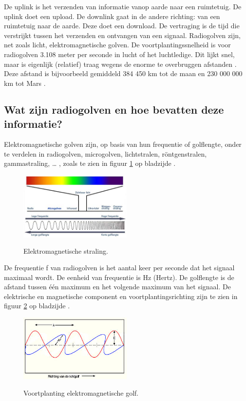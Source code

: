 De uplink is het verzenden van informatie vanop aarde naar een ruimtetuig. De uplink doet een upload. De downlink gaat in de andere richting: van een ruimtetuig naar de aarde. Deze doet een download. De vertraging is de tijd die verstrijkt tussen het verzenden en ontvangen van een signaal. Radiogolven zijn, net zoals licht, elektromagnetische golven. De voortplantingssnelheid is voor radiogolven 3.108 meter per seconde in lucht of het luchtledige. Dit lijkt snel, maar is eigenlijk (relatief) traag wegens de enorme te overbruggen afstanden \cite{updown}. Deze afstand is bijvoorbeeld gemiddeld 384 450 km tot de maan \cite{maan} en 230 000 000 km tot Mars \cite{mars}.

\subsection{Wat zijn radiogolven en hoe bevatten deze informatie?}

Elektromagnetische golven zijn, op basis van hun frequentie of golflengte, onder te verdelen in radiogolven, microgolven, lichtstralen, röntgenstralen, gammastraling, … \cite{radiowaves}, zoals te zien in figuur \ref{fig:EMS} op bladzijde \pageref{fig:EMS}.

\begin{figure}[ht]
  \centering
  \includegraphics[width=0.5\textwidth]{voorbeeld_figuren/spectrum_straling}
  \caption{Elektromagnetische straling.}
  \cite{energiezonnepanelen} %
  \label{fig:EMS}
\end{figure}

De frequentie f van radiogolven is het aantal keer per seconde dat het signaal maximaal wordt. De eenheid van frequentie is Hz (Hertz). De golflengte is de afstand tussen één maximum en het volgende maximum van het signaal. De elektrische en magnetische component en voortplantingsrichting zijn te zien in figuur \ref{fig:golf} op bladzijde \pageref{fig:golf}.

\begin{figure}[ht]
  \centering
  \includegraphics[width=0.5\textwidth]{voorbeeld_figuren/elektromagnetische_golf}
  \caption{Voortplanting elektromagnetische golf.}
  \cite{elektromagnetischestraling}
  \label{fig:golf}
\end{figure}

